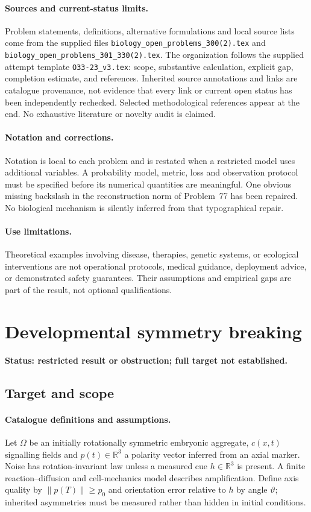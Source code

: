 \documentclass[11pt]{article}
\begin{document}
\paragraph{Sources and current-status limits.}
Problem statements, definitions, alternative formulations and local source lists
come from the supplied files
\texttt{biology\_open\_problems\_300(2).tex} and
\texttt{biology\_open\_problems\_301\_330(2).tex}.
The organization follows the supplied attempt template
\texttt{O33-23\_v3.tex}: scope, substantive calculation, explicit gap,
completion estimate, and references. Inherited source annotations and links are
catalogue provenance, not evidence that every link or current open status has
been independently rechecked. Selected methodological references appear at the
end. No exhaustive literature or novelty audit is claimed.

\paragraph{Notation and corrections.}
Notation is local to each problem and is restated when a restricted model uses
additional variables. A probability model, metric, loss and observation protocol
must be specified before its numerical quantities are meaningful. One obvious
missing backslash in the reconstruction norm of Problem~77 has been repaired.
No biological mechanism is silently inferred from that typographical repair.

\paragraph{Use limitations.}
Theoretical examples involving disease, therapies, genetic systems, or ecological
interventions are not operational protocols, medical guidance, deployment advice,
or demonstrated safety guarantees. Their assumptions and empirical gaps are part
of the result, not optional qualifications.


\section*{Developmental symmetry breaking}
\label{prob:123}
\noindent\textbf{Status: restricted result or obstruction; full target not established.}
\subsection{Target and scope}
\paragraph{Catalogue definitions and assumptions.}
Let $\Omega$ be an initially rotationally symmetric embryonic aggregate, $c(x,t)$ signalling fields and $p(t)\in\mathbb{R}^3$ a polarity vector inferred from an axial marker. Noise has rotation-invariant law unless a measured cue $h\in\mathbb{R}^3$ is present. A finite reaction--diffusion and cell-mechanics model describes amplification. Define axis quality by $\|p(T)\|\geq p_0$ and orientation error relative to $h$ by angle $\vartheta$; inherited asymmetries must be measured rather than hidden in initial conditions.
\end{document}

